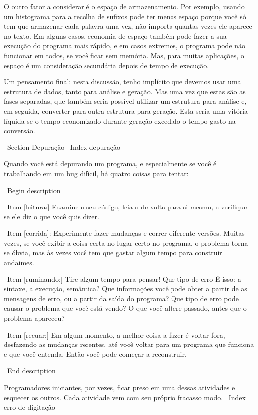 \documentclass[10pt]{book}
\begin{document}
\begin {itemize}
{{{{{{{{{{O outro fator a considerar é o espaço de armazenamento. Por exemplo, usando um
histograma para a recolha de sufixos pode ter menos espaço porque
você só tem que armazenar cada palavra uma vez, não importa quantas vezes ele
aparece no texto. Em alguns casos, economia de espaço também pode fazer a sua
execução do programa mais rápido, e em casos extremos, o programa pode não funcionar em
todos, se você ficar sem memória. Mas, para muitas aplicações, o espaço é um
consideração secundária depois de tempo de execução.

Um pensamento final: nesta discussão, tenho implícito que
devemos usar uma estrutura de dados, tanto para análise e geração. Mas
uma vez que estas são as fases separadas, que também seria possível utilizar um
estrutura para análise e, em seguida, converter para outra estrutura para
geração. Esta seria uma vitória líquida se o tempo economizado durante
geração excedido o tempo gasto na conversão.


\ Section {} Depuração
\ Index {depuração}

Quando você está depurando um programa, e especialmente se você é
trabalhando em um bug difícil, há quatro coisas para tentar:

\ Begin {description}

\ Item [leitura:] Examine o seu código, leia-o de volta para si mesmo, e
verifique se ele diz o que você quis dizer.

\ Item [corrida]: Experimente fazer mudanças e correr diferente
versões. Muitas vezes, se você exibir a coisa certa no lugar certo
no programa, o problema torna-se óbvia, mas às vezes você tem que
gastar algum tempo para construir andaimes.

\ Item [ruminando:] Tire algum tempo para pensar! Que tipo de erro
É isso: a sintaxe, a execução, semântica? Que informações você pode obter a partir de
as mensagens de erro, ou a partir da saída do programa? Que tipo de
erro pode causar o problema que você está vendo? O que você altere
passado, antes que o problema apareceu?

\ Item [recuar:] Em algum momento, a melhor coisa a fazer é voltar
fora, desfazendo as mudanças recentes, até você voltar para um programa que
funciona e que você entenda. Então você pode começar a reconstruir.

\ End {description}

Programadores iniciantes, por vezes, ficar preso em uma dessas atividades
e esquecer os outros. Cada atividade vem com seu próprio fracasso
modo.
\ Index {erro de digitação}

}}}}}}}}}}
\end{itemize}
\end{document}
